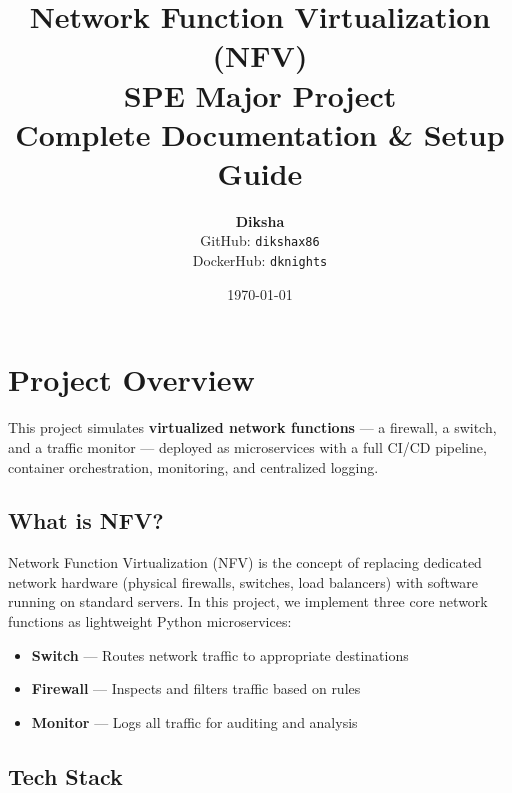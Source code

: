 \documentclass[12pt,a4paper]{article}
\title{
    \vspace{-2cm}
    \textbf{\Huge Network Function Virtualization (NFV)}\\[0.5cm]
    \Large SPE Major Project\\[0.3cm]
    \large Complete Documentation \& Setup Guide
}
\author{
    \textbf{Diksha}\\
    GitHub: \texttt{dikshax86}\\
    DockerHub: \texttt{dknights}
}
\date{\today}
\begin{document}
\maketitle
\thispagestyle{empty}
\newpage
\tableofcontents
\newpage

\section{Project Overview}

This project simulates \textbf{virtualized network functions} --- a firewall, a switch, and a traffic monitor --- deployed as microservices with a full CI/CD pipeline, container orchestration, monitoring, and centralized logging.

\subsection{What is NFV?}

Network Function Virtualization (NFV) is the concept of replacing dedicated network hardware (physical firewalls, switches, load balancers) with software running on standard servers. In this project, we implement three core network functions as lightweight Python microservices:

\begin{itemize}
    \item \textbf{Switch} --- Routes network traffic to appropriate destinations
    \item \textbf{Firewall} --- Inspects and filters traffic based on rules
    \item \textbf{Monitor} --- Logs all traffic for auditing and analysis
\end{itemize}

\subsection{Tech Stack}
\end{document}
